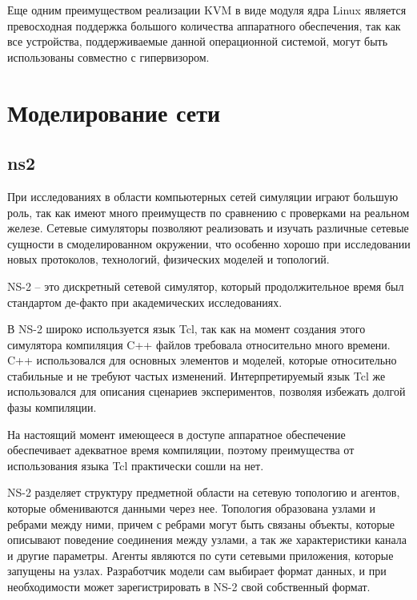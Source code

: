 Еще одним преимуществом реализации KVM в виде модуля ядра Linux является превосходная
поддержка большого количества аппаратного обеспечения, так как все устройства, 
поддерживаемые данной операционной системой, могут быть использованы совместно
с гипервизором.
\cite{RedHat:kvm}



\section{Моделирование сети}

\subsection{ns2}

При исследованиях в области компьютерных сетей симуляции играют большую роль, так как
имеют много преимуществ по сравнению с проверками на реальном железе.
Сетевые симуляторы позволяют реализовать и изучать различные сетевые сущности в 
смоделированном окружении, что особенно хорошо при исследовании новых протоколов,
технологий, физических моделей и топологий.

NS-2 -- это дискретный сетевой симулятор, который продолжительное время был стандартом
де-факто при академических исследованиях.

В NS-2 широко используется язык Tcl, так как на момент создания этого симулятора
компиляция C++ файлов требовала относительно много времени. C++ использовался для
основных элементов и моделей, которые относительно стабильные и не требуют частых
изменений. Интерпретируемый язык Tcl же использовался для описания сценариев 
экспериментов, позволяя избежать долгой фазы компиляции.
\cite{Font:2010:ADS:1878537.1878651}

На настоящий момент имеющееся в доступе аппаратное обеспечение обеспечивает
адекватное время компиляции, поэтому преимущества от использования языка Tcl 
практически сошли на нет.

NS-2 разделяет структуру предметной области на сетевую топологию и агентов, которые
обмениваются данными через нее. Топология образована узлами и ребрами между ними,
причем с ребрами могут быть связаны объекты, которые описывают поведение соединения
между узлами, а так же характеристики канала и другие параметры.
Агенты являются по сути сетевыми приложения, которые запущены на узлах. Разработчик
модели сам выбирает формат данных, и при необходимости может зарегистрировать
в NS-2 свой собственный формат.

